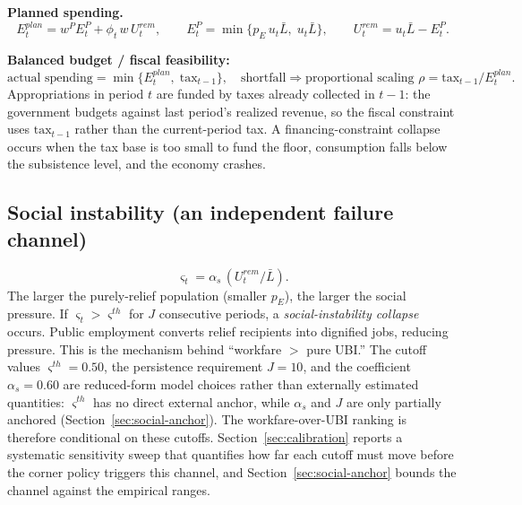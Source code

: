 \documentclass[review,12pt]{elsarticle}
\theoremstyle{plain}
\theoremstyle{definition}
\theoremstyle{remark}
\newcommand{\barL}{\bar{L}}
\begin{document}
\textbf{Planned spending.}
\begin{equation}
E_t^{plan}=w^P E_t^P+\phi_t\,w\,U_t^{rem},\qquad
E_t^P=\min\{p_E\,u_t\barL,\;u_t\barL\},\qquad U_t^{rem}=u_t\barL-E_t^P.
\end{equation}

\textbf{Balanced budget / fiscal feasibility:}
\begin{equation}
\text{actual spending}=\min\{E_t^{plan},\;\text{tax}_{t-1}\},\quad
\text{shortfall}\Rightarrow \text{proportional scaling }\rho=\text{tax}_{t-1}/E_t^{plan}.
\end{equation}
Appropriations in period $t$ are funded by taxes already collected in $t-1$: the government budgets against last period's realized revenue, so the fiscal constraint uses $\text{tax}_{t-1}$ rather than the current-period tax. A financing-constraint collapse occurs when the tax base is too small to fund the floor, consumption falls below the subsistence level, and the economy crashes.

\subsection{Social instability (an independent failure channel)}
\label{sec:social-instability}
\begin{equation}
\varsigma_t=\alpha_s\,(U_t^{rem}/\barL).
\end{equation}
The larger the purely-relief population (smaller $p_E$), the larger the social pressure. If $\varsigma_t>\varsigma^{th}$ for $J$ consecutive periods, a \emph{social-instability collapse} occurs. Public employment converts relief recipients into dignified jobs, reducing pressure. This is the mechanism behind ``workfare $>$ pure UBI.'' The cutoff values $\varsigma^{th}=0.50$, the persistence requirement $J=10$, and the coefficient $\alpha_s=0.60$ are reduced-form model choices rather than externally estimated quantities: $\varsigma^{th}$ has no direct external anchor, while $\alpha_s$ and $J$ are only partially anchored (Section~\ref{sec:social-anchor}). The workfare-over-UBI ranking is therefore conditional on these cutoffs. Section~\ref{sec:calibration} reports a systematic sensitivity sweep that quantifies how far each cutoff must move before the corner policy triggers this channel, and Section~\ref{sec:social-anchor} bounds the channel against the empirical ranges.
\end{document}
